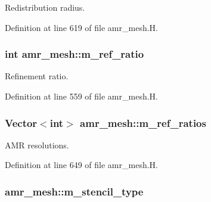 Redistribution radius. 



Definition at line 619 of file amr\+\_\+mesh.\+H.

\subsubsection[{\texorpdfstring{m\+\_\+ref\+\_\+ratio}{m_ref_ratio}}]{\setlength{\rightskip}{0pt plus 5cm}int amr\+\_\+mesh\+::m\+\_\+ref\+\_\+ratio\hspace{0.3cm}{\ttfamily [protected]}}\hypertarget{classamr__mesh_abff7af18596c17ac7cbfb30e26d18437}{}\label{classamr__mesh_abff7af18596c17ac7cbfb30e26d18437}


Refinement ratio. 



Definition at line 559 of file amr\+\_\+mesh.\+H.

\subsubsection[{\texorpdfstring{m\+\_\+ref\+\_\+ratios}{m_ref_ratios}}]{\setlength{\rightskip}{0pt plus 5cm}Vector$<$int$>$ amr\+\_\+mesh\+::m\+\_\+ref\+\_\+ratios\hspace{0.3cm}{\ttfamily [protected]}}\hypertarget{classamr__mesh_aa31efb6fc699acef8826555989ea803c}{}\label{classamr__mesh_aa31efb6fc699acef8826555989ea803c}


A\+MR resolutions. 



Definition at line 649 of file amr\+\_\+mesh.\+H.

\subsubsection[{\texorpdfstring{m\+\_\+stencil\+\_\+type}{m_stencil_type}}]{ amr\+\_\+mesh\+::m\+\_\+stencil\+\_\+type\hspace{0.3cm}{\ttfamily [protected]}}\hypertarget{classamr__mesh_a8563dddb0f8cc6946e0e865c0e90dae4}{}\label{classamr__mesh_a8563dddb0f8cc6946e0e865c0e90dae4}


